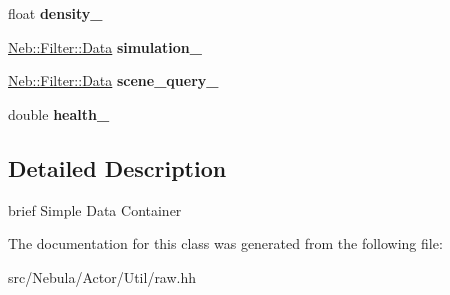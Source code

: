 \begin{DoxyCompactItemize}
\item 
\hypertarget{classNeb_1_1Actor_1_1Util_1_1Raw_ad5fd3d4b695b8992224c7c0da8bda44f}{float {\bfseries density\-\_\-}}\label{classNeb_1_1Actor_1_1Util_1_1Raw_ad5fd3d4b695b8992224c7c0da8bda44f}

\item 
\hypertarget{classNeb_1_1Actor_1_1Util_1_1Raw_a8a7fce3b6fcbef5900051ee4c030f232}{\hyperlink{classNeb_1_1Filter_1_1Data}{Neb\-::\-Filter\-::\-Data} {\bfseries simulation\-\_\-}}\label{classNeb_1_1Actor_1_1Util_1_1Raw_a8a7fce3b6fcbef5900051ee4c030f232}

\item 
\hypertarget{classNeb_1_1Actor_1_1Util_1_1Raw_a60a289fefdfb2a5587d6153def4725b5}{\hyperlink{classNeb_1_1Filter_1_1Data}{Neb\-::\-Filter\-::\-Data} {\bfseries scene\-\_\-query\-\_\-}}\label{classNeb_1_1Actor_1_1Util_1_1Raw_a60a289fefdfb2a5587d6153def4725b5}

\item 
\hypertarget{classNeb_1_1Actor_1_1Util_1_1Raw_a3de204fcfb553c73efd87c8bc04e3c43}{double {\bfseries health\-\_\-}}\label{classNeb_1_1Actor_1_1Util_1_1Raw_a3de204fcfb553c73efd87c8bc04e3c43}

\end{DoxyCompactItemize}


\subsection{Detailed Description}
brief Simple Data Container 

The documentation for this class was generated from the following file\-:\begin{DoxyCompactItemize}
\item 
src/\-Nebula/\-Actor/\-Util/raw.\-hh\end{DoxyCompactItemize}
